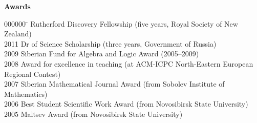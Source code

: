 \documentclass[12pt]{article}
\begin{document}
\centerline{\bf Awards}
\begin{tabbing}
000000	\=		\> Rutherford Discovery Fellowship (five years, Royal Society of New Zealand)\\
2011	\> Dr of Science Scholarship (three years, Government of Russia)\\
2009	\> Siberian Fund for Algebra and Logic Award (2005--2009)\\
2008	\> Award for excellence in teaching (at ACM-ICPC North-Eastern European Regional Contest)\\
2007	\> Siberian Mathematical Journal Award (from Sobolev Institute of Mathematics)\\
2006	\> Best Student Scientific Work Award (from Novosibirsk State University)\\
2005	\> Maltsev Award (from Novosibirsk State University)\iftoggle{full}{\\
2000	\> Gold Medal (from the Government of Russia, Novokuznetsk High School \#32)
}{}
\end{tabbing}
\end{document}
